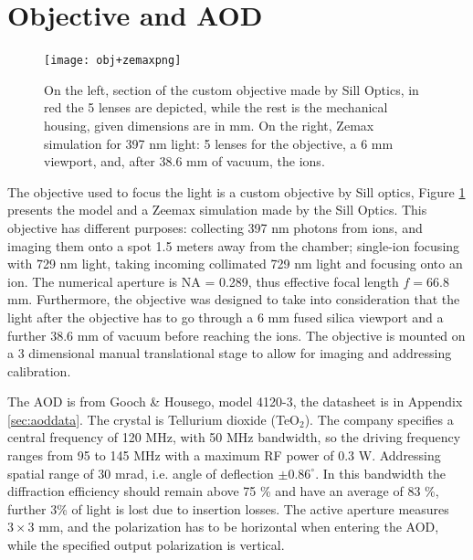 \section{Objective and AOD}
\label{sec:obj}
%
\begin{figure}[H]
      \centering
          \centering
          \texttt{[image: obj+zemaxpng]}
           \caption{On the left, section of the custom objective made by Sill Optics, in red the 5 lenses are depicted, while the rest is the mechanical housing, given dimensions are in mm. On the right, Zemax simulation for 397 nm light: 5 lenses for the objective, a 6 mm viewport, and, after 38.6 mm of vacuum, the ions.}
          \label{objsection}
\end{figure}
The objective used to focus the light is a custom objective by Sill optics, Figure \ref{objsection} presents the model and a Zeemax simulation made by the Sill Optics. This objective has different purposes: collecting 397 nm photons from ions, and imaging them onto a spot 1.5 meters away from the chamber; single-ion focusing with 729 nm light, taking incoming collimated 729 nm light and focusing onto an ion. The numerical aperture is NA = 0.289, thus effective focal length $f = 66.8$ mm. Furthermore, the objective was designed to take into consideration that the light after the objective has to go through a 6 mm fused silica viewport and a further 38.6 mm of vacuum before reaching the ions. The objective is mounted on a 3 dimensional manual translational stage to allow for imaging and addressing calibration.\par
The AOD is from Gooch \& Housego, model 4120-3, the datasheet is in Appendix \ref{sec:aoddata}. The crystal is Tellurium dioxide (TeO$_2$). The company specifies a central frequency of 120 MHz, with 50 MHz bandwidth, so the driving frequency ranges from 95 to 145 MHz with a maximum RF power of 0.3 W. Addressing spatial range of 30 mrad, i.e. angle of deflection $\pm 0.86^{\circ}$. In this bandwidth the diffraction efficiency should remain above 75 \% and have an average of 83 \%, further 3\% of light is lost due to insertion losses. The active aperture measures $3\times 3$ mm, and the polarization has to be horizontal when entering the AOD, while the specified output polarization is vertical.

